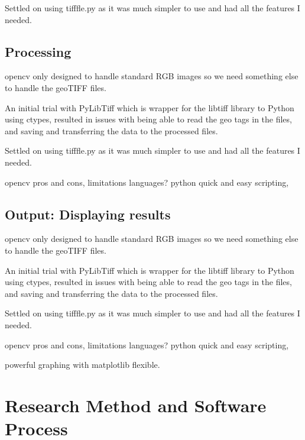 Settled on using tifffle.py \cite{tifffle} as it was much simpler to use and had all the features I needed.

\subsection{Processing}

opencv only designed to handle standard RGB images so we need something else to handle the geoTIFF files.

An initial trial with PyLibTiff \cite{pylibtiff} which is wrapper for the libtiff library to Python using ctypes, resulted in issues with being able to read the geo tags in the files, and saving and transferring the data to the processed files.

Settled on using tifffle.py \cite{tifffle} as it was much simpler to use and had all the features I needed.


opencv pros and cons, limitations
languages? python quick and easy scripting, 


\subsection{Output: Displaying results}

opencv only designed to handle standard RGB images so we need something else to handle the geoTIFF files.

An initial trial with PyLibTiff \cite{pylibtiff} which is wrapper for the libtiff library to Python using ctypes, resulted in issues with being able to read the geo tags in the files, and saving and transferring the data to the processed files.

Settled on using tifffle.py \cite{tifffle} as it was much simpler to use and had all the features I needed.


opencv pros and cons, limitations
languages? python quick and easy scripting, 



powerful graphing with matplotlib flexible.



\section{Research Method and Software Process}
\begin{comment}
You need to describe briefly the life cycle model or research method that you used. You do not need to write about all of the different process models that you are aware of. Focus on the process model or research method that you have used. It is possible that you needed to adapt an existing method to suit your project; clearly identify what you used and how you adapted it for your needs.

For the research-oriented projects, there needs to be a suitable process for the construction of the software elements that support your work.
\end{comment}


